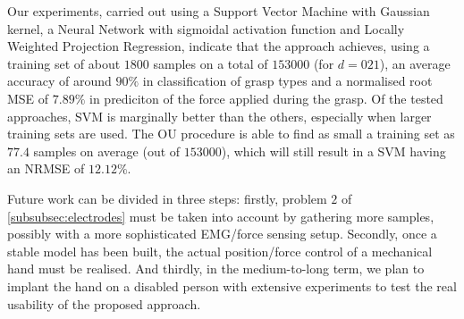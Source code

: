Our experiments, carried out using a Support Vector Machine with
Gaussian kernel, a Neural Network with sigmoidal activation function
and Locally Weighted Projection Regression, indicate that the approach
achieves, using a training set of about $1800$ samples on a total of
$153000$ (for $d=021$), an average accuracy of around $90\%$ in
classification of grasp types and a normalised root MSE of $7.89\%$ in
prediciton of the force applied during the grasp. Of the tested
approaches, SVM is marginally better than the others, especially when
larger training sets are used. The OU procedure is able to find as
small a training set as $77.4$ samples on average (out of $153000$),
which will still result in a SVM having an NRMSE of $12.12\%$.

Future work can be divided in three steps: firstly, problem $2$ of 
\ref{subsubsec:electrodes} must be taken into account by gathering
more samples, possibly with a more sophisticated EMG/force sensing
setup. Secondly, once a stable model has been built, the actual
position/force control of a mechanical hand must be realised. And
thirdly, in the medium-to-long term, we plan to implant the hand on a
disabled person with extensive experiments to test the real usability
of the proposed approach.
